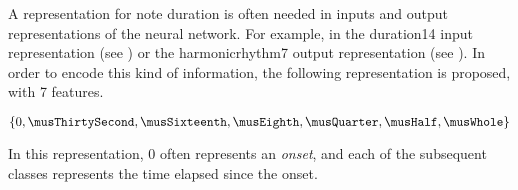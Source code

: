 
A representation for note duration is often needed in inputs
and output representations of the neural network. For
example, in the \gls{duration14} input representation (see
) or the \gls{harmonicrhythm7} output
representation (see ). In
order to encode this kind of information, the following
representation is proposed, with 7 features.

\begin{equation}
    \{0, \musThirtySecond, \musSixteenth, \musEighth, \musQuarter, \musHalf, \musWhole \}
\end{equation}

In this representation, 0 often represents an \emph{onset},
and each of the subsequent classes represents the time
elapsed since the onset.
